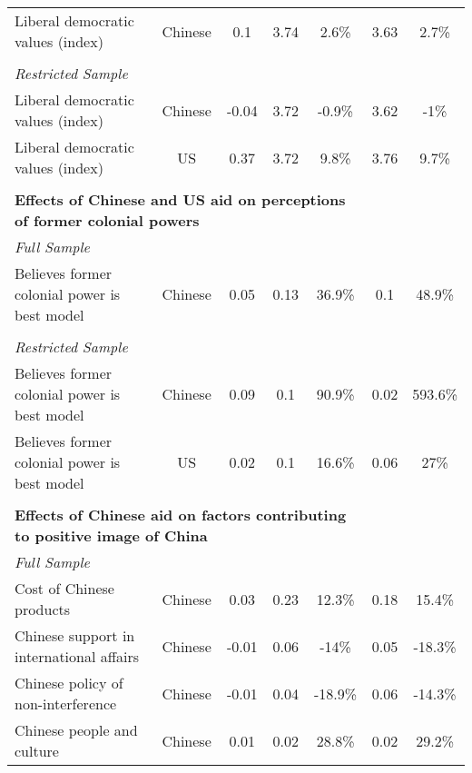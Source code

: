 \begin{tabular}{lcc | cc  | cc}
Liberal democratic values (index) & Chinese & 0.1 & 3.74 & 2.6\% & 3.63 & 2.7\% \\ 
 \multicolumn{3}{l|}{} & \multicolumn{2}{c|}{} & \multicolumn{2}{c}{} \\ 
\multicolumn{3}{l|}{\emph{Restricted Sample}} & \multicolumn{2}{c|}{} & \multicolumn{2}{c}{} \\ 
Liberal democratic values (index) & Chinese & -0.04 & 3.72 & -0.9\% & 3.62 & -1\% \\ 
 Liberal democratic values (index) & US & 0.37 & 3.72 & 9.8\% & 3.76 & 9.7\% \\ 
 \multicolumn{3}{l|}{} & \multicolumn{2}{c|}{} & \multicolumn{2}{c}{} \\ 
\multicolumn{5}{l|}{\bf Effects of Chinese and US aid on perceptions of former colonial powers} & \multicolumn{2}{l}{} \\ 
 \multicolumn{3}{l|}{\emph{Full Sample}} & \multicolumn{2}{c|}{} & \multicolumn{2}{c}{} \\ 
Believes former colonial power is best model & Chinese & 0.05 & 0.13 & 36.9\% & 0.1 & 48.9\% \\ 
 \multicolumn{3}{l|}{} & \multicolumn{2}{c|}{} & \multicolumn{2}{c}{} \\ 
\multicolumn{3}{l|}{\emph{Restricted Sample}} & \multicolumn{2}{c|}{} & \multicolumn{2}{c}{} \\ 
Believes former colonial power is best model & Chinese & 0.09 & 0.1 & 90.9\% & 0.02 & 593.6\% \\ 
 Believes former colonial power is best model & US & 0.02 & 0.1 & 16.6\% & 0.06 & 27\% \\ 
 \multicolumn{3}{l|}{} & \multicolumn{2}{c|}{} & \multicolumn{2}{c}{} \\ 
\multicolumn{5}{l|}{\bf Effects of Chinese aid on factors contributing to positive image of China} & \multicolumn{2}{l}{} \\ 
 \multicolumn{3}{l|}{\emph{Full Sample}} & \multicolumn{2}{c|}{} & \multicolumn{2}{c}{} \\ 
Cost of Chinese products & Chinese & 0.03 & 0.23 & 12.3\% & 0.18 & 15.4\% \\ 
 Chinese support in international affairs & Chinese & -0.01 & 0.06 & -14\% & 0.05 & -18.3\% \\ 
 Chinese policy of non-interference & Chinese & -0.01 & 0.04 & -18.9\% & 0.06 & -14.3\% \\ 
 Chinese people and culture & Chinese & 0.01 & 0.02 & 28.8\% & 0.02 & 29.2\% \\ 

\end{tabular}
